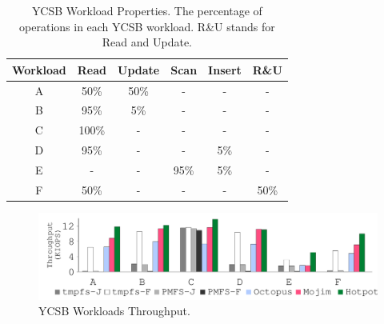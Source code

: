 {
\begin{table}[t]
\begin{center}
\begin{center}
\begin{tabular}{ c | c | c | c | c | c }\normalsize
\normalsize Workload & \normalsize Read & \normalsize Update & \normalsize Scan & \normalsize Insert & \normalsize R\&U \\
\hline
A & 50\% & 50\% & - & - & - \\
B & 95\% & 5\% & - & - & - \\
C & 100\% & - & - & - & - \\
D & 95\% & - & - & 5\% & - \\
E & - & - & 95\% & 5\% & - \\
F & 50\% & - & - & - & 50\% \\
\end{tabular}
\end{center}
\caption[YCSB Workload Properties.]
{
YCSB Workload Properties.
The percentage of operations in each YCSB workload. 
R\&U stands for Read and Update.
}
\label{tbl-ycsb}
\end{center}
\end{table}
}
{
\begin{figure}[t]
\begin{center}
\centerline{\includegraphics[width=\textwidth]{hotpot/Figures/g_plot_YCSB_run_throughput.pdf}}
\caption[YCSB Workloads Throughput.]{YCSB Workloads Throughput.}
\label{fig-ycsbrun}
\end{center}
\end{figure}
}
